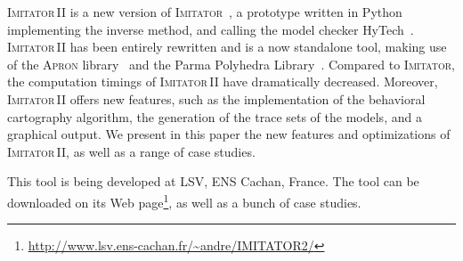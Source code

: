 \documentclass[a4paper,10pt]{article}
\newcommand{\apron}{\textsc{Apron}}
\newcommand{\hytech}{{\sc HyTech}}
\newcommand{\imitator}{\textsc{Imitator}}
\newcommand{\imitatordeux}{\textsc{Imitator}\,II}
\newcommand{\python}{Python}
\begin{document}
\imitatordeux{} is a new version of \imitator{}~\cite{and09}, a prototype written in \python{} implementing the inverse method, and calling the model checker \hytech{}~\cite{hhw97}.
\imitatordeux{} has been entirely rewritten and is a now standalone tool, making use of the \apron{} library~\cite{jm09} and the Parma Polyhedra Library~\cite{bhz08}.
Compared to \imitator{}, the computation timings of \imitatordeux{} have dramatically decreased.
Moreover, \imitatordeux{} offers new features, such as the implementation of the behavioral cartography algorithm, the generation of the trace sets of the models, and a graphical output.
We present in this paper the new features and optimizations of \imitatordeux{}, as well as a range of case studies.

This tool is being developed at LSV, ENS Cachan, France.
The tool can be downloaded on its Web page\footnote{\url{http://www.lsv.ens-cachan.fr/~andre/IMITATOR2/}}, as well as a bunch of case studies.



\end{document}
